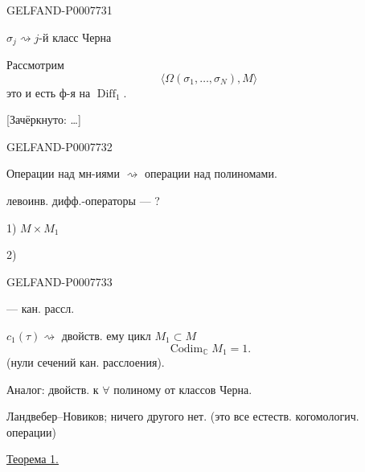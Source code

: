 \begin{GelfandAdjacentEvidence}{GELFAND-P000773}{1}

\(\sigma_j\rightsquigarrow j\)-й класс Черна

Рассмотрим
\[
\langle\Omega(\sigma_1,\ldots,\sigma_N),M\rangle
\]
это и есть ф-я на \(\operatorname{Diff}_1\).

[Зачёркнуто: …]
\end{GelfandAdjacentEvidence}
\begin{GelfandAdjacentEvidence}{GELFAND-P000773}{2}

Операции над мн-иями \(\rightsquigarrow\) операции над полиномами.

левоинв. дифф.-операторы --- ?

1) \(M\times M_1\)

2)
\end{GelfandAdjacentEvidence}
\begin{GelfandAdjacentEvidence}{GELFAND-P000773}{3}

--- кан. рассл.

\(c_1(\tau)\rightsquigarrow\) двойств. ему цикл \(M_1\subset M\)
\[
\operatorname{Codim}_{\mathbb C}M_1=1.
\]
(нули сечений кан. расслоения).

Аналог: двойств. к \(\forall\) полиному от классов Черна.

Ландвебер--Новиков; ничего другого нет. (это все естеств. когомологич. операции)

\underline{Теорема 1.}

\end{GelfandAdjacentEvidence}
